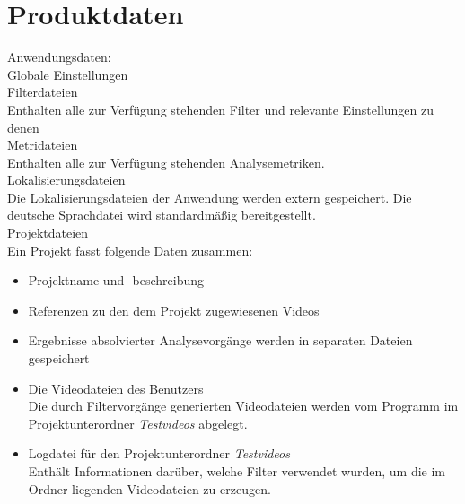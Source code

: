 

\chapter{Produktdaten}
\setcounter{counterKriterien}{0}
Anwendungsdaten: \\
 Globale Einstellungen \\
 Filterdateien \\
Enthalten alle zur Verfügung stehenden Filter und relevante Einstellungen zu denen \\
 Metridateien \\
Enthalten alle zur Verfügung stehenden Analysemetriken. \\
 Lokalisierungsdateien \\
Die Lokalisierungsdateien der Anwendung werden extern gespeichert. Die deutsche Sprachdatei wird standardmäßig bereitgestellt. \\
 Projektdateien \\
Ein Projekt fasst folgende Daten zusammen:
\begin{itemize}
\item Projektname und -beschreibung
\item Referenzen zu den dem Projekt zugewiesenen Videos
\item Ergebnisse absolvierter Analysevorgänge werden in separaten Dateien gespeichert
\item Die Videodateien des Benutzers \\
Die durch Filtervorgänge generierten Videodateien werden vom Programm im Projektunterordner \emph{Testvideos} abgelegt.
\item Logdatei für den Projektunterordner \emph{Testvideos} \\
Enthält Informationen darüber, welche Filter verwendet wurden, um die im Ordner liegenden Videodateien zu erzeugen.
\end{itemize}